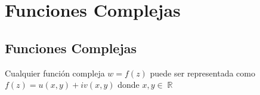 \documentclass[12pt, fleqn]{report}                             %
\DeclareMathOperator \Reals     {\mathbb{R}}                     %
\begin{document}
\part{Funciones Complejas}
\clearpage

    \chapter{Funciones Complejas}
        \clearpage

        Cualquier función compleja $w = f(z)$ puede ser representada como $f(z) = u(x, y) + iv(x, y)$ donde $x, y \in \Reals$



            
\end{document}
